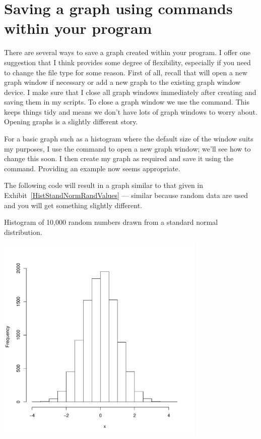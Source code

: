 \section{Saving a graph using commands within your \R{} program} 
 
There are several ways to save a graph created within your \R{} program. I offer one suggestion that I think provides some degree of flexibility, especially if you need to change the file type for some reason. First of all, recall that \R{} will open a new graph window if necessary or add a new graph to the existing graph window device. I make sure that I close all graph windows immediately after creating and saving them in my \R{} scripts. To close a graph window we use the  command. This keeps things tidy and means we don't have lots of graph windows to worry about. Opening graphs is a slightly different story. 
 
For a basic graph such as a histogram where the default size of the window suits my purposes, I use the  command to open a new graph window; we'll see how to change this soon. I then create my graph as required and save it using the  command. Providing an example now seems appropriate.  
 
The following code will result in a graph similar to that given in Exhibit~\ref{HistStandNormRandValues} --- similar because random data are used and you will get something slightly different.\begin{exhibit} 
\begin{center} 
\caption{Histogram of 10,000 random numbers drawn from a standard normal distribution. \label{HistStandNormRandValues}} 
\includegraphics[width=10cm]{figures/StoreResultsHistRand10000Z-1} 
\end{center} 
\end{exhibit} 

